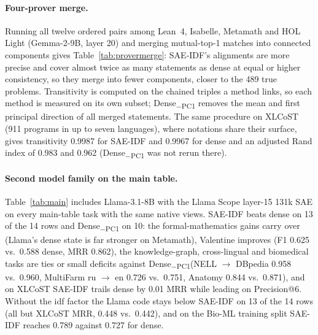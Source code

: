 \documentclass[11pt]{article}
\newcommand{\method}{SAE\mbox{-}IDF\xspace}
\newcommand{\pcone}{Dense\textsubscript{$-$PC1}\xspace}
\begin{document}
\begin{table}[H]
  \centering\footnotesize
  
  \caption{Alternative feature weightings on the same sparse codes (MRR unless stated). Bold: best per row.}
  \label{tab:weightings}
\end{table}

\paragraph{Four-prover merge.}
Running all twelve ordered pairs among Lean~4, Isabelle, Metamath and HOL Light (Gemma-2-9B, layer 20) and merging mutual-top-1 matches into connected components gives Table~\ref{tab:provermerge}: \method's alignments are more precise and cover almost twice as many statements as dense at equal or higher consistency, so they merge into fewer components, closer to the 489 true problems. Transitivity is computed on the chained triples a method links, so each method is measured on its own subset; \pcone removes the mean and first principal direction of all merged statements. The same procedure on XLCoST (911 programs in up to seven languages), where notations share their surface, gives transitivity 0.9987 for \method and 0.9967 for dense and an adjusted Rand index of 0.983 and 0.962 (\pcone was not rerun there).

\begin{table}[H]
  \centering\footnotesize
  
  \caption{Merge and transitivity over the four miniF2F provers (489 problems, up to four statements each). Precision and coverage are means over the twelve ordered pairs' mutual-top-1 alignments; in parentheses, the number of chained triples behind each transitivity.}
  \label{tab:provermerge}
\end{table}

\paragraph{Second model family on the main table.}
Table~\ref{tab:main} includes Llama-3.1-8B with the Llama Scope layer-15 131k SAE on every main-table task with the same native views.
\method beats dense on 13 of the 14 rows and \pcone on 10: the formal-mathematics gains carry over (Llama's dense state is far stronger on Metamath), Valentine improves (F1 0.625 vs.\ 0.588 dense, MRR 0.862), the knowledge-graph, cross-lingual and biomedical tasks are ties or small deficits against \pcone (NELL $\to$ DBpedia 0.958 vs.\ 0.960, MultiFarm ru $\to$ en 0.726 vs.\ 0.751, Anatomy 0.844 vs.\ 0.871), and on XLCoST \method trails dense by 0.01 MRR while leading on Precision@6.
Without the idf factor the Llama code stays below \method on 13 of the 14 rows (all but XLCoST MRR, 0.448 vs.\ 0.442), and on the Bio-ML training split \method reaches 0.789 against 0.727 for dense.
\end{document}
